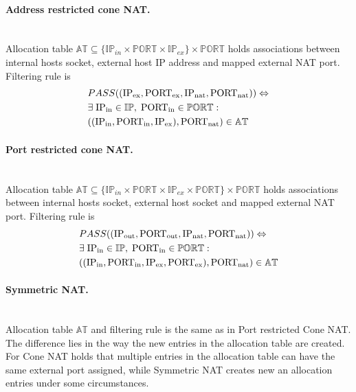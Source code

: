 \documentclass[twoside]{article}
\begin{document}
\begin{multicols}{2}
\paragraph{Address restricted cone NAT.} ~\\
Allocation table $\mathbb{AT} \subseteq \{\mathbb{IP}_{in} \times \mathbb{PORT} \times \mathbb{IP}_{ex}\} \times \mathbb{PORT}$ 
holds associations between internal hosts socket, external host IP address and mapped external NAT port. 
Filtering rule is
\begin{align*}
& PASS((\text{IP\textsubscript{ex}}, \text{PORT\textsubscript{ex}}, \text{IP\textsubscript{nat}}, \text{PORT\textsubscript{nat}} )) \Leftrightarrow \\
&  \exists \; \text{IP\textsubscript{in}} \in \mathbb{IP}, \; \text{PORT\textsubscript{in}} \in \mathbb{PORT}:\\
& ((\text{IP\textsubscript{in}}, \text{PORT\textsubscript{in}}, \text{IP\textsubscript{ex}}), \text{PORT\textsubscript{nat}} ) \in \mathbb{AT}
\end{align*}

\paragraph{Port restricted cone NAT.} ~\\
Allocation table $\mathbb{AT} \subseteq \{\mathbb{IP}_{in} \times \mathbb{PORT} \times \mathbb{IP}_{ex} \times \mathbb{PORT}\} \times \mathbb{PORT}$ 
holds associations between internal hosts socket, external host socket and mapped external NAT port. 
Filtering rule is
\begin{align*}
& PASS((\text{IP\textsubscript{out}}, \text{PORT\textsubscript{out}}, \text{IP\textsubscript{nat}}, \text{PORT\textsubscript{nat}} )) \Leftrightarrow \\
&  \exists \; \text{IP\textsubscript{in}} \in \mathbb{IP}, \; \text{PORT\textsubscript{in}} \in \mathbb{PORT}:\\
& ((\text{IP\textsubscript{in}}, \text{PORT\textsubscript{in}}, \text{IP\textsubscript{ex}}, \text{PORT\textsubscript{ex}}), \text{PORT\textsubscript{nat}} ) \in \mathbb{AT}
\end{align*}

\paragraph{Symmetric NAT.} ~\\
Allocation table $\mathbb{AT}$ and filtering rule is the same as in Port restricted Cone NAT. The difference lies in the way 
the new entries in the allocation table are created. For Cone NAT holds that multiple entries in the allocation table 
can have the same external port assigned, while Symmetric NAT creates new an allocation entries under some circumstances.


\end{multicols}
\end{document}
